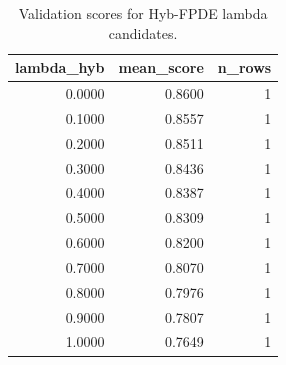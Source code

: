 \begin{table}[t]
\caption{Validation scores for Hyb-FPDE lambda candidates.}
\label{tab:lambda_distribution_computed}
\centering
\begin{tabular}{rrr}
\toprule
lambda\_hyb & mean\_score & n\_rows \\
\midrule
0.0000 & 0.8600 & 1 \\
0.1000 & 0.8557 & 1 \\
0.2000 & 0.8511 & 1 \\
0.3000 & 0.8436 & 1 \\
0.4000 & 0.8387 & 1 \\
0.5000 & 0.8309 & 1 \\
0.6000 & 0.8200 & 1 \\
0.7000 & 0.8070 & 1 \\
0.8000 & 0.7976 & 1 \\
0.9000 & 0.7807 & 1 \\
1.0000 & 0.7649 & 1 \\
\bottomrule
\end{tabular}

\end{table}
